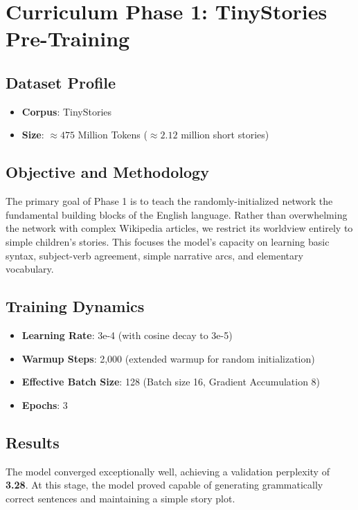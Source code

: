 \documentclass[12pt]{article}
\begin{document}
\section{Curriculum Phase 1: TinyStories Pre-Training}
\subsection{Dataset Profile}
\begin{itemize}
    \item \textbf{Corpus}: TinyStories
    \item \textbf{Size}: $\approx 475$ Million Tokens ($\approx 2.12$ million short stories)
\end{itemize}

\subsection{Objective and Methodology}
The primary goal of Phase 1 is to teach the randomly-initialized network the fundamental building blocks of the English language. Rather than overwhelming the network with complex Wikipedia articles, we restrict its worldview entirely to simple children's stories. This focuses the model's capacity on learning basic syntax, subject-verb agreement, simple narrative arcs, and elementary vocabulary.

\subsection{Training Dynamics}
\begin{itemize}
    \item \textbf{Learning Rate}: 3e-4 (with cosine decay to 3e-5)
    \item \textbf{Warmup Steps}: 2,000 (extended warmup for random initialization)
    \item \textbf{Effective Batch Size}: 128 (Batch size 16, Gradient Accumulation 8)
    \item \textbf{Epochs}: 3
\end{itemize}

\subsection{Results}
The model converged exceptionally well, achieving a validation perplexity of \textbf{3.28}. At this stage, the model proved capable of generating grammatically correct sentences and maintaining a simple story plot.
\end{document}
